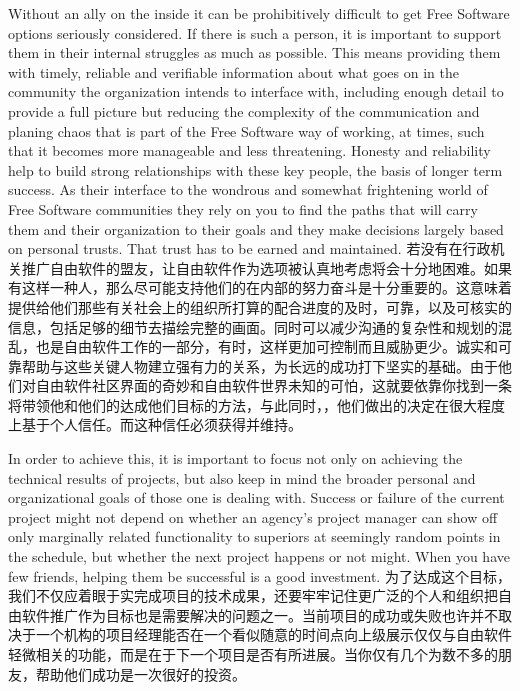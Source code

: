 Without an ally on the inside it can be prohibitively difficult to get
Free Software options seriously considered. If there is such a person, it is important
to support them in their internal struggles as much as possible. This
means providing them with timely, reliable and verifiable information about
what goes on in the community the organization intends to interface with,
including enough detail to provide a full picture but reducing the
complexity of the communication and planing chaos that is part of the Free
Software way of working, at times, such that it becomes more manageable and
less threatening. Honesty and reliability help to build strong
relationships with these key people, the basis of longer term success. As
their interface to the wondrous and somewhat frightening world of Free
Software communities they rely on you to find the paths that will carry
them and their organization to their goals and they make decisions largely
based on personal trusts. That trust has to be earned and maintained.
若没有在行政机关推广自由软件的盟友，让自由软件作为选项被认真地考虑将会十分地困难。如果有这样一种人，那么尽可能支持他们的在内部的努力奋斗是十分重要的。这意味着提供给他们那些有关社会上的组织所打算的配合进度的及时，可靠，以及可核实的信息，包括足够的细节去描绘完整的画面。同时可以减少沟通的复杂性和规划的混乱，也是自由软件工作的一部分，有时，这样更加可控制而且威胁更少。诚实和可靠帮助与这些关键人物建立强有力的关系，为长远的成功打下坚实的基础。由于他们对自由软件社区界面的奇妙和自由软件世界未知的可怕，这就要依靠你找到一条将带领他和他们的达成他们目标的方法，与此同时，，他们做出的决定在很大程度上基于个人信任。而这种信任必须获得并维持。

In order to achieve this, it is important to focus not only on achieving
the technical results of projects, but also keep in mind the broader personal and organizational
goals of those one is dealing with. Success or failure of the current
project might not depend on whether an agency's project manager can show off
only marginally related functionality to superiors at seemingly random points
in the schedule, but whether the next project happens or not might. When you have
few friends, helping them be successful is a good investment.
为了达成这个目标，我们不仅应着眼于实完成项目的技术成果，还要牢牢记住更广泛的个人和组织把自由软件推广作为目标也是需要解决的问题之一。当前项目的成功或失败也许并不取决于一个机构的项目经理能否在一个看似随意的时间点向上级展示仅仅与自由软件轻微相关的功能，而是在于下一个项目是否有所进展。当你仅有几个为数不多的朋友，帮助他们成功是一次很好的投资。

